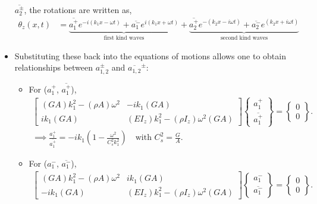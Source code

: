 \documentclass[aspectratio=169]{beamertmd}
\begin{document}
\begin{frame}[allowframebreaks]
\begin{itemize}
    $\overline{a_2^\pm}$, the rotations are written as,
    \begin{align*}
      \theta_z(x, t) &= \underbrace{\overline{a_1^+} e^{-i(k_1x-\omega t)}
                       + \overline{a_1^-} e^{i(k_1x+\omega
                       t)}}_{\text{first kind waves}} +
                       \underbrace{\overline{a_2^+} e^{-(k_2x-i\omega t)} +
                       \overline{a_2^-} e^{(k_2x+i\omega t)}}_{\text{second
                       kind waves}} 
    \end{align*}
  \item Substituting these back into the equations of motions allows
    one to obtain relationships between $a_{1,2}^\pm$ and
    $\overline{a_{1,2}}^\pm$:
    \begin{itemize}
    \item For ($a_1^+$, $\overline{a_1^+}$),
      \begin{align*}
        \begin{bmatrix} (GA)k_1^2-(\rho A)\omega^2 & -ik_1(GA)\\
          ik_1(GA) & (EI_z)k_1^2-(\rho I_z)\omega^2
          (GA) \end{bmatrix} \begin{Bmatrix} a_1^+\\
          \overline{a_1^+} \end{Bmatrix} = \begin{Bmatrix} 0\\
          0 \end{Bmatrix}.\\
        \implies \boxed{\frac{a_1^+}{\overline{a_1^+}} =
        -ik_1\left(1-\frac{\omega^2}{C_s^2k_1^2}\right)} \quad
        \text{with } C_s^2 = \frac{G}{A}.
      \end{align*}        
    \item For ($a_1^-$, $\overline{a_1^-}$),
      \begin{align*}
        \begin{bmatrix} (GA)k_1^2-(\rho A)\omega^2 & ik_1(GA)\\
          -ik_1(GA) & (EI_z)k_1^2-(\rho I_z)\omega^2
          (GA) \end{bmatrix} \begin{Bmatrix} a_1^-\\
          \overline{a_1^-} \end{Bmatrix} = \begin{Bmatrix} 0\\
          0 \end{Bmatrix}.\\

\end{align*}
\end{itemize}
\end{itemize}
\end{frame}
\end{document}
